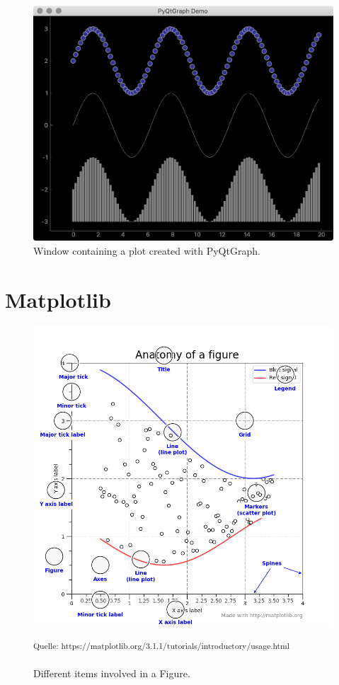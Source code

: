 \begin{figure}[h]
    \centering
    \includegraphics[width=14cm]{resources/img/PyQtGraphDemo}
    \caption{Window containing a plot created with PyQtGraph.}
    \label{a:fig:pyqtgraph:window}
\end{figure}

\clearpage

\section{Matplotlib}
\label{sec:appendix:matplotlib}

\begin{figure}[h]
    \centering
    \includegraphics[width=14cm]{resources/img/MatplotlibContent}
    \caption{Different items involved in a Figure.}
    \small\textsuperscript{Quelle: https://matplotlib.org/3.1.1/tutorials/introductory/usage.html}
    \label{a:fig:matplotlib:content}
\end{figure}

